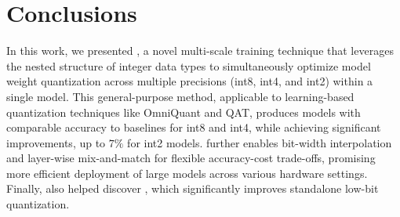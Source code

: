 \vspace*{-2mm}
% 


\section{Conclusions}
\label{sec:conc}
In this work, we presented \alg, a novel multi-scale training technique that leverages the nested structure of integer data types to simultaneously optimize model weight quantization across multiple precisions (int8, int4, and int2) within a single model. This general-purpose method, applicable to learning-based quantization techniques like OmniQuant and QAT, produces models with comparable accuracy to baselines for int8 and int4, while achieving significant improvements, up to $7\%$ for int2 models. \alg further enables bit-width interpolation and layer-wise mix-and-match for flexible accuracy-cost trade-offs, promising more efficient deployment of large models across various hardware settings. Finally, \alg also helped discover \spalg, which significantly improves standalone low-bit quantization.